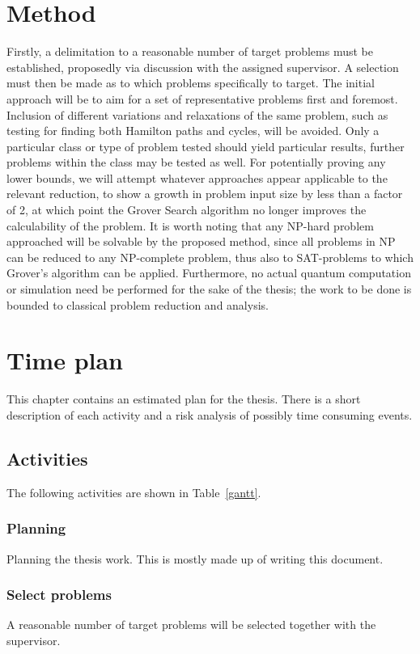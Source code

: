 \documentclass[msc,lith,english]{liuthesis}
\begin{document}
\chapter{Method}
Firstly, a delimitation to a reasonable number of target problems must be established, proposedly via discussion with the assigned supervisor. A selection must then be made as to which problems specifically to target. The initial approach will be to aim for a set of representative problems first and foremost. Inclusion of different variations and relaxations of the same problem, such as testing for finding both Hamilton paths and cycles, will be avoided. Only a particular class or type of problem tested should yield particular results, further problems within the class may be tested as well. For potentially proving any lower bounds, we will attempt whatever approaches appear applicable to the relevant reduction, to show a growth in problem input size by less than a factor of 2, at which point the Grover Search algorithm no longer improves the calculability of the problem. It is worth noting that any NP-hard problem approached will be solvable by the proposed method, since all problems in NP can be reduced to any NP-complete problem, thus also to SAT-problems to which Grover’s algorithm can be applied. Furthermore, no actual quantum computation or simulation need be performed for the sake of the thesis; the work to be done is bounded to classical problem reduction and analysis.

\chapter{Time plan}
This chapter contains an estimated plan for the thesis. There is a short description of each activity and a risk analysis of possibly time consuming events.

\section{Activities}
The following activities are shown in Table~\ref{gantt}.

\subsection{Planning}
Planning the thesis work. This is mostly made up of writing this document.

\subsection{Select problems}
A reasonable number of target problems will be selected together with the supervisor.
\end{document}
